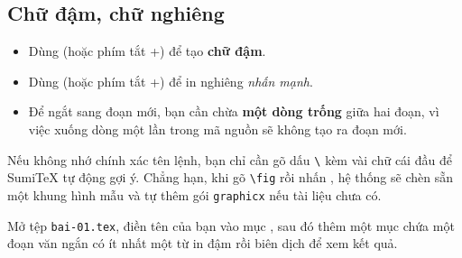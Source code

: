 \subsection{Chữ đậm, chữ nghiêng}
\begin{itemize}
  \item Dùng  (hoặc phím tắt +) để
    tạo \textbf{chữ đậm}.
  \item Dùng  (hoặc phím tắt +) để
    in nghiêng \emph{nhấn mạnh}.
  \item Để ngắt sang đoạn mới, bạn cần chừa \textbf{một dòng trống} giữa hai
    đoạn, vì việc xuống dòng một lần trong mã nguồn sẽ không tạo ra đoạn mới.
\end{itemize}

\begin{meo}
Nếu không nhớ chính xác tên lệnh, bạn chỉ cần gõ dấu \texttt{\textbackslash}
kèm vài chữ cái đầu để SumiTeX tự động gợi ý. Chẳng hạn, khi gõ
\texttt{\textbackslash fig} rồi nhấn , hệ thống sẽ chèn sẵn một
khung hình mẫu và tự thêm gói \texttt{graphicx} nếu tài liệu chưa có.
\end{meo}

\begin{thuchanh}[Bài 1]
Mở tệp \texttt{bai-01.tex}, điền tên của bạn vào mục , sau đó thêm
một mục  chứa một đoạn văn ngắn có ít nhất một từ
in đậm rồi biên dịch để xem kết quả.
\end{thuchanh}